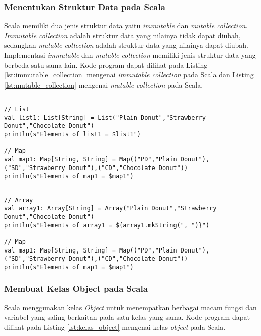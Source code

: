 \newpage
\subsubsection{Menentukan Struktur Data pada Scala}
Scala memiliki dua jenis struktur data yaitu \textit{immutable} dan \textit{mutable collection}. \textit{Immutable collection} adalah struktur data yang nilainya tidak dapat diubah, sedangkan \textit{mutable collection} adalah struktur data yang nilainya dapat diubah. Implementasi \textit{immutable} dan \textit{mutable collection} memiliki jenis struktur data yang berbeda satu sama lain. Kode program dapat dilihat pada Listing \ref{lst:immutable_collection} mengenai \textit{immutable collection} pada Scala dan Listing \ref{lst:mutable_collection} mengenai \textit{mutable collection} pada Scala.

\begin{lstlisting}[basicstyle=\ttfamily, frame=single,
	columns=fullflexible, keepspaces=true, breaklines=true, label=lst:immutable_collection, caption=Membuat immutable collection pada Scala]
	
// List
val list1: List[String] = List("Plain Donut","Strawberry Donut","Chocolate Donut")
println(s"Elements of list1 = $list1")

// Map
val map1: Map[String, String] = Map(("PD","Plain Donut"),("SD","Strawberry Donut"),("CD","Chocolate Donut"))
println(s"Elements of map1 = $map1")

\end{lstlisting}

\begin{lstlisting}[basicstyle=\ttfamily, frame=single,
	columns=fullflexible, keepspaces=true, breaklines=true, label=lst:mutable_collection, caption=Membuat mutable collection pada Scala]
	
// Array
val array1: Array[String] = Array("Plain Donut","Strawberry Donut","Chocolate Donut")
println(s"Elements of array1 = ${array1.mkString(", ")}")

// Map
val map1: Map[String, String] = Map(("PD","Plain Donut"),("SD","Strawberry Donut"),("CD","Chocolate Donut"))
println(s"Elements of map1 = $map1")

\end{lstlisting}

\subsubsection{Membuat Kelas Object pada Scala}
Scala menggunakan kelas \textit{Object} untuk menempatkan berbagai macam fungsi dan variabel yang saling berkaitan pada satu kelas yang sama. Kode program dapat dilihat pada Listing \ref{lst:kelas_object} mengenai kelas \textit{object} pada Scala.

